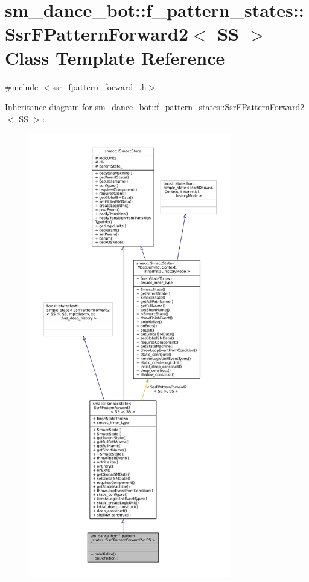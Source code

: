 \hypertarget{structsm__dance__bot_1_1f__pattern__states_1_1SsrFPatternForward2}{}\section{sm\+\_\+dance\+\_\+bot\+:\+:f\+\_\+pattern\+\_\+states\+:\+:Ssr\+F\+Pattern\+Forward2$<$ SS $>$ Class Template Reference}
\label{structsm__dance__bot_1_1f__pattern__states_1_1SsrFPatternForward2}


{\ttfamily \#include $<$ssr\+\_\+fpattern\+\_\+forward\+\_.\+h$>$}



Inheritance diagram for sm\+\_\+dance\+\_\+bot\+:\+:f\+\_\+pattern\+\_\+states\+:\+:Ssr\+F\+Pattern\+Forward2$<$ SS $>$\+:
\nopagebreak
\begin{figure}[H]
\begin{center}
\leavevmode
\includegraphics[height=550pt]{structsm__dance__bot_1_1f__pattern__states_1_1SsrFPatternForward2__inherit__graph}
\end{center}
\end{figure}


